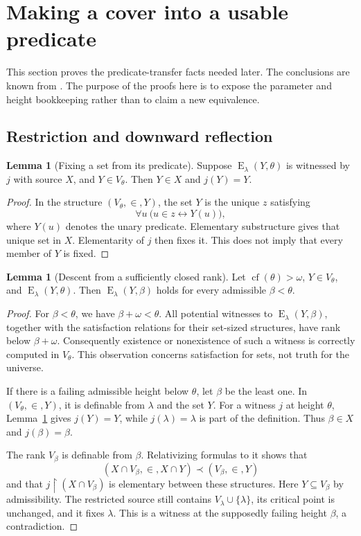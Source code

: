 \documentclass[11pt,letterpaper]{article}
\theoremstyle{definition}
\newtheorem{lemma}[definition]{Lemma}
\newcommand{\cf}{\operatorname{cf}}
\newcommand{\restr}{\mathbin{\upharpoonright}}
\newcommand{\Erel}{\operatorname{E}}
\begin{document}
\section{Making a cover into a usable predicate}\label{sec:predicates}

This section proves the predicate-transfer facts needed later. The conclusions are known from \cite[Lemma 3.3 and Proposition 3.4]{cover}. The purpose of the proofs here is to expose the parameter and height bookkeeping rather than to claim a new equivalence.

\subsection{Restriction and downward reflection}

\begin{lemma}[Fixing a set from its predicate]\label{lem:fix-predicate}
Suppose $\Erel_\lambda(Y,\theta)$ is witnessed by $j$ with source $X$, and $Y\in V_\theta$. Then $Y\in X$ and $j(Y)=Y$.
\end{lemma}
\begin{proof}
In the structure $(V_\theta,\in,Y)$, the set $Y$ is the unique $z$ satisfying
\[
\forall u\ \bigl(u\in z\longleftrightarrow Y(u)\bigr),
\]
where $Y(u)$ denotes the unary predicate. Elementary substructure gives that unique set in $X$. Elementarity of $j$ then fixes it. This does not imply that every member of $Y$ is fixed.
\end{proof}

\begin{lemma}[Descent from a sufficiently closed rank]\label{lem:descent}
Let $\cf(\theta)>\omega$, $Y\in V_\theta$, and $\Erel_\lambda(Y,\theta)$. Then $\Erel_\lambda(Y,\beta)$ holds for every admissible $\beta<\theta$.
\end{lemma}
\begin{proof}
For $\beta<\theta$, we have $\beta+\omega<\theta$. All potential witnesses to $\Erel_\lambda(Y,\beta)$, together with the satisfaction relations for their set-sized structures, have rank below $\beta+\omega$. Consequently existence or nonexistence of such a witness is correctly computed in $V_\theta$. This observation concerns satisfaction for sets, not truth for the universe.

If there is a failing admissible height below $\theta$, let $\beta$ be the least one. In $(V_\theta,\in,Y)$, it is definable from $\lambda$ and the set $Y$. For a witness $j$ at height $\theta$, Lemma~\ref{lem:fix-predicate} gives $j(Y)=Y$, while $j(\lambda)=\lambda$ is part of the definition. Thus $\beta\in X$ and $j(\beta)=\beta$.

The rank $V_\beta$ is definable from $\beta$. Relativizing formulas to it shows that
\[
(X\cap V_\beta,\in,X\cap Y)\prec(V_\beta,\in,Y)
\]
and that $j\restr(X\cap V_\beta)$ is elementary between these structures. Here $Y\subseteq V_\beta$ by admissibility. The restricted source still contains $V_\lambda\cup\{\lambda\}$, its critical point is unchanged, and it fixes $\lambda$. This is a witness at the supposedly failing height $\beta$, a contradiction.
\end{proof}
\end{document}
